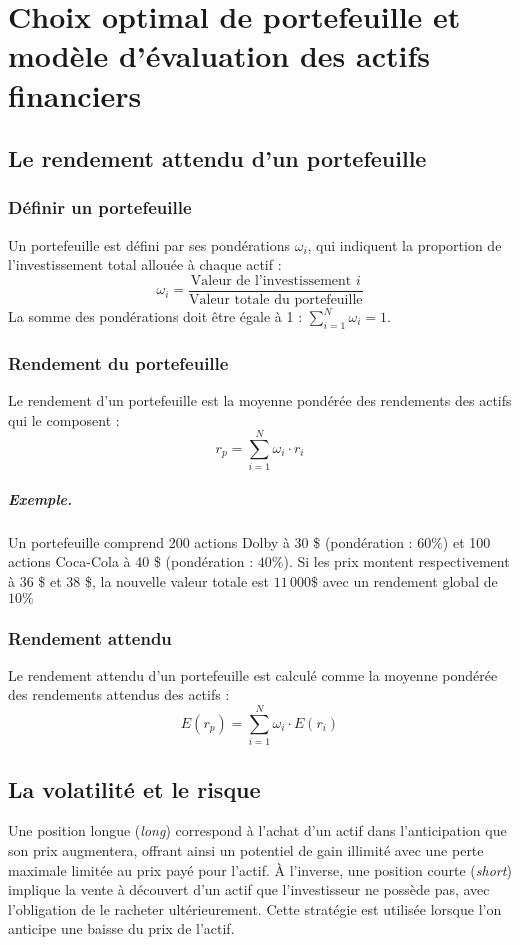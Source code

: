 \documentclass[a4paper, 12pt]{report}
\begin{document}
	
	\chapter{Choix optimal de portefeuille et modèle d’évaluation des actifs financiers}
	
\section{Le rendement attendu d’un portefeuille}

\subsection{Définir un portefeuille}
Un portefeuille est défini par ses pondérations $\omega_i$, qui indiquent la proportion de l’investissement total allouée à chaque actif :
\[
\omega_i = \frac{\text{Valeur de l'investissement } i}{\text{Valeur totale du portefeuille}}
\]
La somme des pondérations doit être égale à 1 : $\sum_{i=1}^N \omega_i = 1$.

\subsection{Rendement du portefeuille}
Le rendement d’un portefeuille est la moyenne pondérée des rendements des actifs qui le composent :
\[
r_p = \sum_{i=1}^N \omega_i \cdot r_i
\]

\paragraph{Exemple.} 
Un portefeuille comprend 200 actions Dolby à 30 \$ (pondération : $60\%$) et 100 actions Coca-Cola à 40 \$ (pondération : $40\%$). Si les prix montent respectivement à 36 \$ et 38 \$, la nouvelle valeur totale est $11\,000\$ $ avec un rendement global de $ 10\% $ 

\subsection{Rendement attendu}
Le rendement attendu d’un portefeuille est calculé comme la moyenne pondérée des rendements attendus des actifs :
\[
E(r_p) = \sum_{i=1}^N \omega_i \cdot E(r_i)
\]

\section{La volatilité et le risque}

Une position longue (\textit{long}) correspond à l'achat d'un actif dans l'anticipation que son prix augmentera, offrant ainsi un potentiel de gain illimité avec une perte maximale limitée au prix payé pour l'actif. À l'inverse, une position courte (\textit{short}) implique la vente à découvert d'un actif que l'investisseur ne possède pas, avec l'obligation de le racheter ultérieurement. Cette stratégie est utilisée lorsque l'on anticipe une baisse du prix de l'actif.
\end{document}
